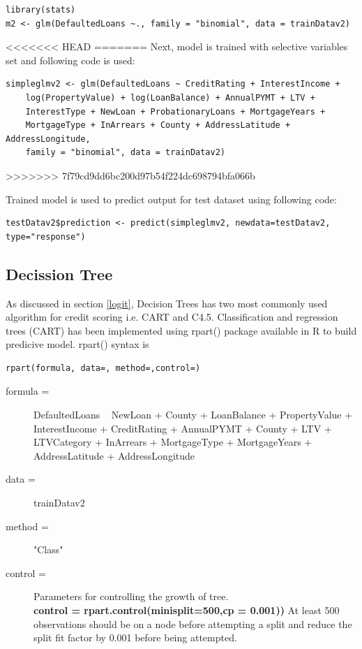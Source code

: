 \begin{verbatim}
library(stats)
m2 <- glm(DefaultedLoans ~., family = "binomial", data = trainDatav2)
\end{verbatim}

<<<<<<< HEAD
=======
Next, model is trained with selective variables set and following code is used:

\begin{verbatim}
simpleglmv2 <- glm(DefaultedLoans ~ CreditRating + InterestIncome + 
    log(PropertyValue) + log(LoanBalance) + AnnualPYMT + LTV + 
    InterestType + NewLoan + ProbationaryLoans + MortgageYears + 
    MortgageType + InArrears + County + AddressLatitude + AddressLongitude, 
    family = "binomial", data = trainDatav2)
\end{verbatim}
>>>>>>> 7f79cd9dd6bc200d97b54f224dc698794bfa066b

Trained model is used to predict output for test dataset using following code:
\begin{verbatim}
testDatav2$prediction <- predict(simpleglmv2, newdata=testDatav2,
type="response")
\end{verbatim}


\subsection{Decission Tree}

As discussed in section \ref{logit}, Decision Trees has two most commonly used algorithm for credit scoring i.e. CART and C4.5. Classification and regression trees (CART) has been implemented using rpart() package available in R to build predicive model. rpart() syntax is \begin{verbatim}
rpart(formula, data=, method=,control=)
\end{verbatim}

\begin{description}
  \item[formula =] DefaultedLoans ~ NewLoan + County + LoanBalance + PropertyValue + InterestIncome + CreditRating + AnnualPYMT + County + LTV + LTVCategory + InArrears + MortgageType + MortgageYears + AddressLatitude + AddressLongitude
  \item[data =]trainDatav2
  \item[method =] "Class"
  \item [control =] Parameters for controlling the growth of tree. \\
  \textbf{control =  rpart.control(minisplit=500,cp = 0.001))} At least 500 observations should be on a node before attempting a split and reduce the split fit factor by 0.001 before being attempted.
\end{description}


